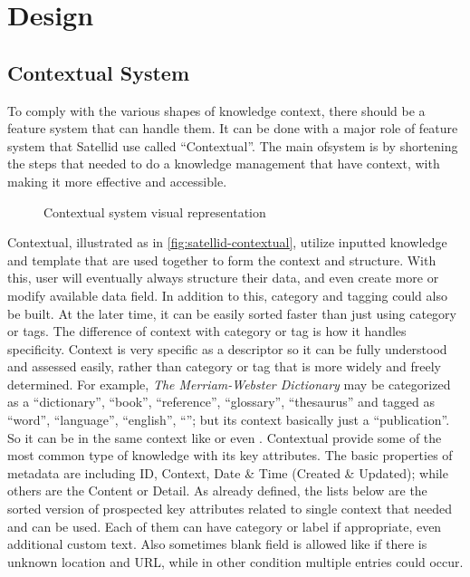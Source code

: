 \section{Design}
\label{sec:design}

\subsection{Contextual System}

To comply with the various shapes of knowledge context, there should be a feature system that can handle them.
It can be done with a major role of feature system that Satellid use called ``Contextual''.
The main ofsystem is by shortening the steps that needed to do a knowledge management that have context, with making it more effective and accessible.

\begin{figure}[htb]
    \centering
    \caption{Contextual system visual representation}
    \label{fig:satellid-contextual}
\end{figure}

Contextual, illustrated as in \autoref{fig:satellid-contextual}, utilize inputted knowledge and template that are used together to form the context and structure.
With this, user will eventually always structure their data, and even create more or modify available data field.
In addition to this, category and tagging could also be built.
At the later time, it can be easily sorted faster than just using category or tags.
The difference of context with category or tag is how it handles specificity.
Context is very specific as a descriptor so it can be fully understood and assessed easily, rather than category or tag that is more widely and freely determined.
For example, \textit{The Merriam-Webster Dictionary} may be categorized as a ``dictionary'', ``book'', ``reference'', ``glossary'', ``thesaurus'' and tagged as ``word'', ``language'', ``english'', ``''; but its context basically just a ``publication''.
So it can be in the same context like  or even .
Contextual provide some of the most common type of knowledge with its key attributes.
The basic properties of metadata are including ID, Context, Date \& Time (Created \& Updated); while others are the Content or Detail.
As already defined, the lists below are the sorted version of prospected key attributes related to single context that needed and can be used.
Each of them can have category or label if appropriate, even additional custom text.
Also sometimes blank field is allowed like if there is unknown location and URL, while in other condition multiple entries could occur.

